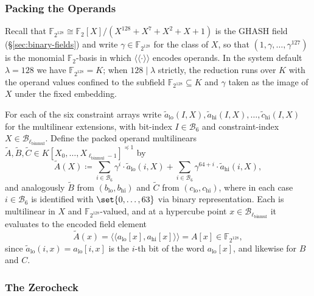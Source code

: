 \documentclass{article}
\theoremstyle{definition}
\newcommand*{\mlin}{{\preceq 1}}
\newcommand*{\mle}{\widetilde}
\newcommand{\BB}{\mathcal{B}}
\newcommand{\FF}[1]{\mathbb{F}_{#1}}
\newcommand{\gval}[1]{\langle\!\langle #1 \rangle\!\rangle}
\begin{document}
\subsubsection{Packing the Operands}
\label{sec:binmul-packing}

Recall that $\FF{2^{128}} \cong \FF{2}[X] / (X^{128} + X^7 + X^2 + X + 1)$ is the GHASH field (\S\ref{sec:binary-fields}) and write $\gamma \in \FF{2^{128}}$ for the class of $X$, so that $(1, \gamma, \ldots, \gamma^{127})$ is the monomial $\FF{2}$-basis in which $\gval{\cdot}$ encodes operands. In the system default $\lambda = 128$ we have $\FF{2^{128}} = K$; when $128 \mid \lambda$ strictly, the reduction runs over $K$ with the operand values confined to the subfield $\FF{2^{128}} \subseteq K$ and $\gamma$ taken as the image of $X$ under the fixed embedding.

For each of the six constraint arrays write $\mle{a}_\text{lo}(I, X), \mle{a}_\text{hi}(I, X), \ldots, \mle{c}_\text{hi}(I, X)$ for the multilinear extensions, with bit-index $I \in \BB_6$ and constraint-index $X \in \BB_{\ell_\text{binmul}}$. Define the packed operand multilinears $\mle{A}, \mle{B}, \mle{C} \in K[X_0, \ldots, X_{\ell_\text{binmul} - 1}]^\mlin$ by
\[
  \mle{A}(X) \coloneqq \sum_{i \in \BB_6} \gamma^i \cdot \mle{a}_\text{lo}(i, X) + \sum_{i \in \BB_6} \gamma^{64 + i} \cdot \mle{a}_\text{hi}(i, X),
\]
and analogously $\mle{B}$ from $(b_\text{lo}, b_\text{hi})$ and $\mle{C}$ from $(c_\text{lo}, c_\text{hi})$, where in each case $i \in \BB_6$ is identified with $\set{0, \ldots, 63}$ via binary representation. Each is multilinear in $X$ and $\FF{2^{128}}$-valued, and at a hypercube point $x \in \BB_{\ell_\text{binmul}}$ it evaluates to the encoded field element
\[
  \mle{A}(x) = \gval{a_\text{lo}[x], a_\text{hi}[x]} = A[x] \in \FF{2^{128}},
\]
since $\mle{a}_\text{lo}(i, x) = a_\text{lo}[i, x]$ is the $i$-th bit of the word $a_\text{lo}[x]$, and likewise for $B$ and $C$.

\subsubsection{The Zerocheck}
\label{sec:binmul-zerocheck}
\end{document}
